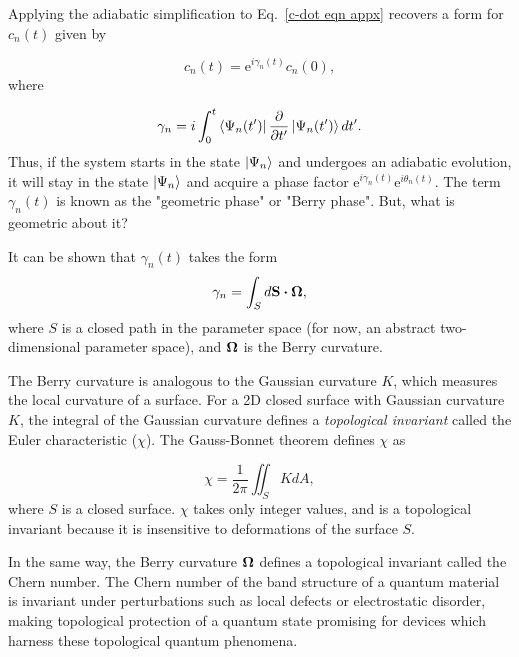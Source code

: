 \documentclass{beavtex_dub_edit}
\begin{document}
Applying the adiabatic simplification to Eq.\ \ref{c-dot eqn appx} recovers a form for $c_n(t)$ given by

\begin{equation}
    c_n(t) = \mathrm{e}^{i \gamma_n(t)}c_n(0),
\end{equation}
where 

\begin{equation}
    \gamma_n = i \int_{0}^{t} \bra{\Psi_n(t')}\pdv{t'}\ket{\Psi_n(t')} dt'. \label{geometric phase}
\end{equation}
Thus, if the system starts in the state $\ket{\Psi_n}$ and undergoes an adiabatic evolution, it will stay in the state $\ket{\Psi_n}$ and acquire a phase factor $\mathrm{e}^{i \gamma_n(t)} \mathrm{e}^{i \theta_n(t)}$. The term $\gamma_n(t)$ is known as the "geometric phase" or "Berry phase". But, what is geometric about it? 

It can be shown that $\gamma_n(t)$ takes the form \cite[p.\ 349-351]{sakurai_modern_1985}
\begin{equation}
    \gamma_n = \int_{S} d\vectorbold{S}\dotproduct \vectorbold{\Omega},
\end{equation}
where $S$ is a closed path in the parameter space (for now, an abstract two-dimensional parameter space), and $\vectorbold{\Omega}$ is the Berry curvature. 

The Berry curvature is analogous to the Gaussian curvature $K$, which measures the local curvature of a surface. For a 2D closed surface with Gaussian curvature $K$, the integral of the Gaussian curvature defines a \textit{topological invariant} called the Euler characteristic ($\chi$). The Gauss-Bonnet theorem defines $\chi$ as

\begin{equation}
    \chi = \frac{1}{2\pi}\iint_S K dA,
\end{equation}
where $S$ is a closed surface. $\chi$ takes only integer values, and is a topological invariant because it is insensitive to deformations of the surface $S$. 

In the same way, the Berry curvature $\vectorbold{\Omega}$ defines a topological invariant called the Chern number. The Chern number of the band structure of a quantum material is invariant under perturbations such as local defects or electrostatic disorder, making topological protection of a quantum state promising for devices which harness these topological quantum phenomena. 
 
\end{document}
